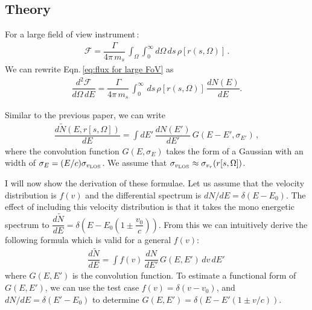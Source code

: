 \documentclass[aps,prl,10pt,twocolumn,superscriptaddress,showpacs]{revtex4-1}
\begin{document}
\subsection{Theory}





For a large field of view instrument\,\cite{Figueroa-Feliciano:2015gwa}:
\begin{eqnarray}
\mathcal{F} = \dfrac{\Gamma}{4\pi \, m_s} \, \int_{\Omega} \int _0 ^\infty d\Omega \, ds \, \rho[r(s, \Omega)] \, .
\label{eq:flux for large FoV}
\end{eqnarray}
We can rewrite Eqn.\,\ref{eq:flux for large FoV} as 
\begin{eqnarray}
\dfrac{d^2 \mathcal{F}}{d\Omega \, dE} =  \dfrac{\Gamma}{4\pi \, m_s} \, \int _0 ^\infty  \, ds \, \rho[r(s, \Omega)] \, \dfrac{dN(E)}{dE} .
\label{eq:double differential for the flux}
\end{eqnarray}

Similar to the previous paper, we can write
\begin{eqnarray}
\dfrac{d \tilde{N} (E, r[s, \Omega])}{dE} =\int dE' \, \dfrac{dN(E')}{dE'} \, G(E - E', \sigma_{E'}) \, ,
\label{eq:formula for modified dNdE}
\end{eqnarray}
where the convolution function $G(E, \sigma_E)$ takes the form of a Gaussian with an width of $\sigma_E = (E/c) \sigma_{v_{\rm LOS}}$.  We assume that $\sigma_{v_{\rm LOS}} \approx \sigma_{v_r}(r[s,\Omega])$.

I will now show the derivation of these formulae.  Let us assume that the velocity distribution is $f(v)$ and the differential spectrum is $dN/dE = \delta (E- E_0)$.  The effect of including this velocity distribution is that it takes the mono energetic spectrum to $\dfrac{d\tilde{N}}{dE} = \delta \left(E - E_0 (1 \pm \dfrac{v_0}{c})\right)$.  From this we can intuitively derive the following formula which is valid for a general $f(v)$:
\begin{eqnarray}
\dfrac{d\tilde{N}}{dE} = \int f(v) \, \dfrac{dN}{dE'} \, G(E, E') \, dv \, dE' \,
\label{eq:step 1}
\end{eqnarray}
where $G(E, E')$ is the convolution function.  To estimate a functional form of $G(E, E')$, we can use the test case $f(v) = \delta (v - v_0)$, and $dN/dE = \delta (E' - E_0)$ to determine $G(E, E') = \delta (E - E' (1 \pm v/c))$.
\end{document}
